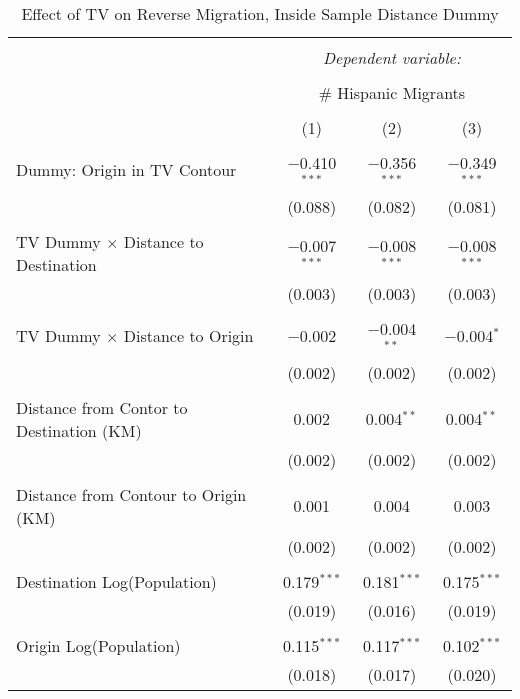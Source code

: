 
\begin{table}[!htbp] \centering 
  \caption{Effect of TV on Reverse Migration, Inside Sample Distance Dummy} 
  \label{} 
\begin{tabular}{@{\extracolsep{5pt}}lccc} 
\\[-1.8ex]\hline 
\hline \\[-1.8ex] 
 & \multicolumn{3}{c}{\textit{Dependent variable:}} \\ 
\cline{2-4} 
\\[-1.8ex] & \multicolumn{3}{c}{\# Hispanic Migrants} \\ 
\\[-1.8ex] & (1) & (2) & (3)\\ 
\hline \\[-1.8ex] 
 Dummy: Origin in TV Contour & $-$0.410$^{***}$ & $-$0.356$^{***}$ & $-$0.349$^{***}$ \\ 
  & (0.088) & (0.082) & (0.081) \\ 
  & & & \\ 
 TV Dummy $\times$ Distance to Destination & $-$0.007$^{***}$ & $-$0.008$^{***}$ & $-$0.008$^{***}$ \\ 
  & (0.003) & (0.003) & (0.003) \\ 
  & & & \\ 
 TV Dummy $\times$ Distance to Origin & $-$0.002 & $-$0.004$^{**}$ & $-$0.004$^{*}$ \\ 
  & (0.002) & (0.002) & (0.002) \\ 
  & & & \\ 
 Distance from Contor to Destination (KM) & 0.002 & 0.004$^{**}$ & 0.004$^{**}$ \\ 
  & (0.002) & (0.002) & (0.002) \\ 
  & & & \\ 
 Distance from Contour to Origin (KM) & 0.001 & 0.004 & 0.003 \\ 
  & (0.002) & (0.002) & (0.002) \\ 
  & & & \\ 
 Destination Log(Population) & 0.179$^{***}$ & 0.181$^{***}$ & 0.175$^{***}$ \\ 
  & (0.019) & (0.016) & (0.019) \\ 
  & & & \\ 
 Origin Log(Population) & 0.115$^{***}$ & 0.117$^{***}$ & 0.102$^{***}$ \\ 
  & (0.018) & (0.017) & (0.020) \\ 

\end{tabular}
\end{table}

